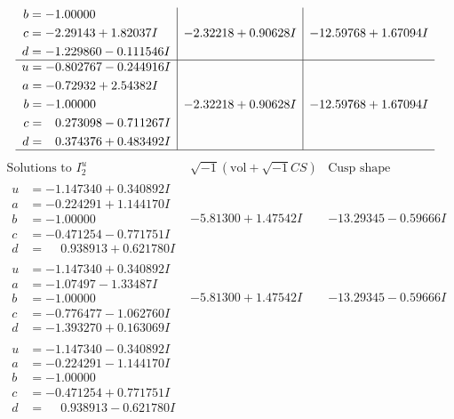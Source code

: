 \documentclass[1p]{elsarticle_modified}
\theoremstyle{definition}
\newcommand{\I}{\sqrt{-1}}
\begin{document}
$$\begin{array}{c|c|c}
\begin{aligned}
b &= -1.00000\phantom{ +0.000000I} \\
c &= -2.29143 + 1.82037 I \\
d &= -1.229860 - 0.111546 I\end{aligned}
 & -2.32218 + 0.90628 I & -12.59768 + 1.67094 I \\ \hline\begin{aligned}
u &= -0.802767 - 0.244916 I \\
a &= -0.72932 + 2.54382 I \\
b &= -1.00000\phantom{ +0.000000I} \\
c &= \phantom{-}0.273098 - 0.711267 I \\
d &= \phantom{-}0.374376 + 0.483492 I\end{aligned}
 & -2.32218 + 0.90628 I & -12.59768 + 1.67094 I\\
 \hline 
 \end{array}$$\newpage$$\begin{array}{c|c|c}  
\text{Solutions to }I^u_{2}& \I (\text{vol} + \sqrt{-1}CS) & \text{Cusp shape}\\
 \hline 
\begin{aligned}
u &= -1.147340 + 0.340892 I \\
a &= -0.224291 + 1.144170 I \\
b &= -1.00000\phantom{ +0.000000I} \\
c &= -0.471254 - 0.771751 I \\
d &= \phantom{-}0.938913 + 0.621780 I\end{aligned}
 & -5.81300 + 1.47542 I & -13.29345 - 0.59666 I \\ \hline\begin{aligned}
u &= -1.147340 + 0.340892 I \\
a &= -1.07497 - 1.33487 I \\
b &= -1.00000\phantom{ +0.000000I} \\
c &= -0.776477 - 1.062760 I \\
d &= -1.393270 + 0.163069 I\end{aligned}
 & -5.81300 + 1.47542 I & -13.29345 - 0.59666 I \\ \hline\begin{aligned}
u &= -1.147340 - 0.340892 I \\
a &= -0.224291 - 1.144170 I \\
b &= -1.00000\phantom{ +0.000000I} \\
c &= -0.471254 + 0.771751 I \\
d &= \phantom{-}0.938913 - 0.621780 I\end{aligned}

\end{array}$$
\end{document}

